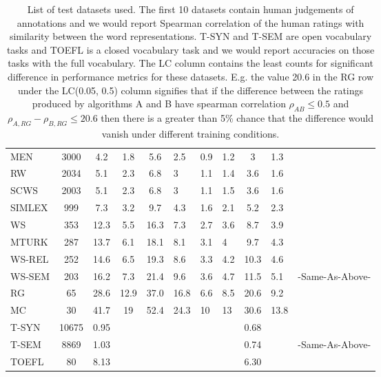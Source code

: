 \begin{table*}[ht]
{\begin{tabular}{l c c c c H H H c H l}
    MEN    & 3000  & 4.2  & 1.8  & 5.6  & 2.5  & 0.9 & 1.2 & 3    & 1.3  & \cite{bruni2012distributional}  \\
    RW     & 2034  & 5.1  & 2.3  & 6.8  & 3    & 1.1 & 1.4 & 3.6  & 1.6  & \cite{Luong2013morpho}          \\
    SCWS   & 2003  & 5.1  & 2.3  & 6.8  & 3    & 1.1 & 1.5 & 3.6  & 1.6  & \cite{Huang2012Improving}       \\
    SIMLEX & 999   & 7.3  & 3.2  & 9.7  & 4.3  & 1.6 & 2.1 & 5.2  & 2.3  & \cite{hill2014simlex}           \\
    WS     & 353   & 12.3 & 5.5  & 16.3 & 7.3  & 2.7 & 3.6 & 8.7  & 3.9  & \cite{finkelstein2001placing}   \\
    MTURK  & 287   & 13.7 & 6.1  & 18.1 & 8.1  & 3.1 & 4   & 9.7  & 4.3  & \cite{Radinsky2011word}         \\
    WS-REL & 252   & 14.6 & 6.5  & 19.3 & 8.6  & 3.3 & 4.2 & 10.3 & 4.6  & \cite{agirre2009study}          \\
    WS-SEM & 203   & 16.2 & 7.3  & 21.4 & 9.6  & 3.6 & 4.7 & 11.5 & 5.1  & -Same-As-Above-                 \\
    RG     & 65    & 28.6 & 12.9 & 37.0 & 16.8 & 6.6 & 8.5 & 20.6 & 9.2  & \cite{Rubenstein1965Contextual} \\
    MC     & 30    & 41.7 & 19   & 52.4 & 24.3 & 10  & 13  & 30.6 & 13.8 & \cite{miller1991contextual}     \\ \hline
    T-SYN  & 10675 & 0.95 &      &      &      &     &     & 0.68 &      & \cite{mikolov2013distributed}   \\
    T-SEM  & 8869  & 1.03 &      &      &      &     &     & 0.74 &      & -Same-As-Above-                 \\ \hline
    TOEFL  & 80    & 8.13 &      &      &      &     &     & 6.30 &      & \cite{landauer1997solution}
  \end{tabular}
  }
  \caption{List of test datasets used. The first 10 datasets contain human
    judgements of annotations and we would report Spearman correlation
    of  the human ratings with similarity between the word
    representations.
    T-SYN and T-SEM are open vocabulary tasks and TOEFL is a closed
    vocabulary task and we would report accuracies on
  those tasks with the full vocabulary. The LC column contains the
  least counts for significant difference in performance metrics for
  these datasets. E.g. the value 20.6 in the RG row under the
  LC(0.05, 0.5) column signifies that if the difference between the
  ratings produced by algorithms A and B have spearman correlation
  $\rho_{AB} \le 0.5$ and $\rho_{A,RG} - \rho_{B,RG} \le 20.6$ then there is a
  greater than 5\% chance that the difference would vanish under
  different training conditions.}
\end{table*}


